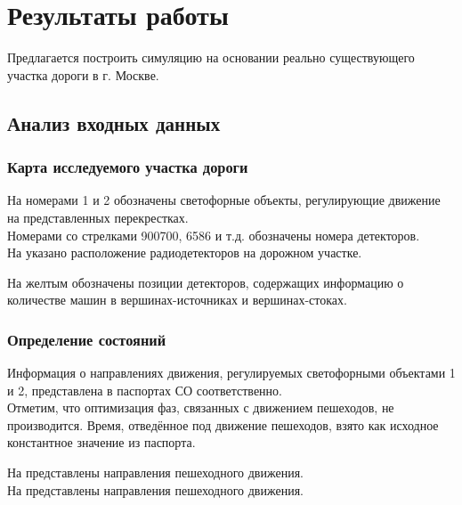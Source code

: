 \chapter{Результаты работы} \label{ch5}
Предлагается построить симуляцию на основании реально существующего участка дороги в г. Москве.
\section{Анализ входных данных} \label{ch5:sec1}
\subsection{Карта исследуемого участка дороги}
\newpage
На  номерами 1 и 2 обозначены светофорные объекты, регулирующие движение на представленных перекрестках.\\
Номерами со стрелками 900700, 6586 и т.д. обозначены номера детекторов.\\


На  указано расположение радиодетекторов на дорожном участке.


\newpage
На  желтым обозначены позиции детекторов, содержащих информацию о количестве машин в вершинах-источниках и вершинах-стоках.


\subsection{Определение состояний}
Информация о направлениях движения, регулируемых светофорными объектами 1 и 2, представлена в паспортах СО соответственно.\\
Отметим, что оптимизация фаз, связанных с движением пешеходов, не производится. Время,  отведённое под движение пешеходов, взято как исходное константное значение из паспорта.

На  представлены направления пешеходного движения.\\

\newpage
На  представлены направления пешеходного движения.

